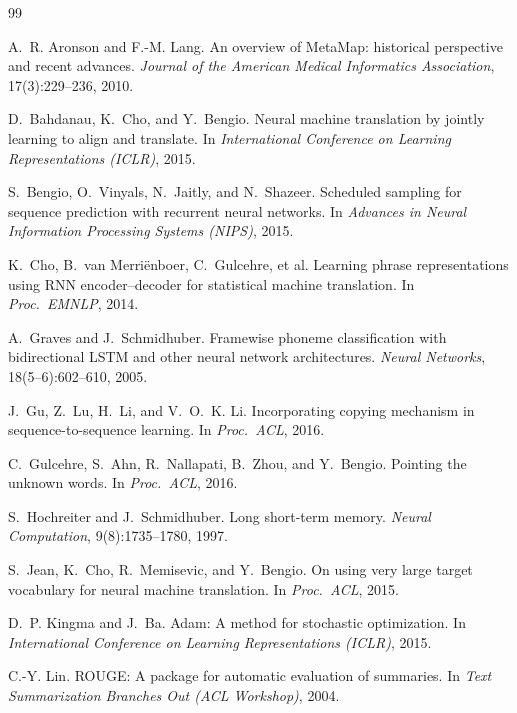 \documentclass{article}
\begin{document}
\small
\begin{thebibliography}{99}

A.~R. Aronson and F.-M. Lang.
\newblock An overview of MetaMap: historical perspective and recent advances.
\newblock \emph{Journal of the American Medical Informatics Association},
17(3):229--236, 2010.

D.~Bahdanau, K.~Cho, and Y.~Bengio.
\newblock Neural machine translation by jointly learning to align and translate.
\newblock In \emph{International Conference on Learning Representations (ICLR)}, 2015.

S.~Bengio, O.~Vinyals, N.~Jaitly, and N.~Shazeer.
\newblock Scheduled sampling for sequence prediction with recurrent neural networks.
\newblock In \emph{Advances in Neural Information Processing Systems (NIPS)}, 2015.

K.~Cho, B.~van Merri\"enboer, C.~Gulcehre, et al.
\newblock Learning phrase representations using RNN encoder--decoder for statistical
machine translation.
\newblock In \emph{Proc.\ EMNLP}, 2014.

A.~Graves and J.~Schmidhuber.
\newblock Framewise phoneme classification with bidirectional LSTM and other neural
network architectures.
\newblock \emph{Neural Networks}, 18(5--6):602--610, 2005.

J.~Gu, Z.~Lu, H.~Li, and V.~O.~K. Li.
\newblock Incorporating copying mechanism in sequence-to-sequence learning.
\newblock In \emph{Proc.\ ACL}, 2016.

C.~Gulcehre, S.~Ahn, R.~Nallapati, B.~Zhou, and Y.~Bengio.
\newblock Pointing the unknown words.
\newblock In \emph{Proc.\ ACL}, 2016.

S.~Hochreiter and J.~Schmidhuber.
\newblock Long short-term memory.
\newblock \emph{Neural Computation}, 9(8):1735--1780, 1997.

S.~Jean, K.~Cho, R.~Memisevic, and Y.~Bengio.
\newblock On using very large target vocabulary for neural machine translation.
\newblock In \emph{Proc.\ ACL}, 2015.

D.~P. Kingma and J.~Ba.
\newblock Adam: A method for stochastic optimization.
\newblock In \emph{International Conference on Learning Representations (ICLR)}, 2015.

C.-Y. Lin.
\newblock ROUGE: A package for automatic evaluation of summaries.
\newblock In \emph{Text Summarization Branches Out (ACL Workshop)}, 2004.


\end{thebibliography}
\end{document}
